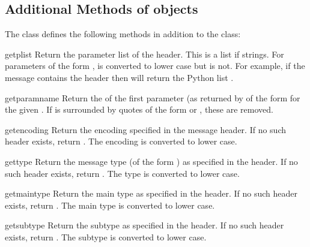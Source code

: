 \subsection{Additional Methods of  objects}

The  class defines the following methods in
addition to the  class:

\renewcommand{\indexsubitem}{(mimetool.Message method)}

\begin{funcdesc}{getplist}{}
Return the parameter list of the  header.  This is
a list if strings.  For parameters of the form
,  is converted to lower case but
 is not.  For example, if the message contains the header
 then
 will return the Python list \code{['spam=1',
'spam=2', 'Spam']}.
\end{funcdesc}

\begin{funcdesc}{getparam}{name}
Return the  of the first parameter (as returned by
 of the form  for the
given .  If  is surrounded by quotes of the form
 or , these are removed.
\end{funcdesc}

\begin{funcdesc}{getencoding}{}
Return the encoding specified in the 
message header.  If no such header exists, return .  The
encoding is converted to lower case.
\end{funcdesc}

\begin{funcdesc}{gettype}{}
Return the message type (of the form )
as specified in the  header.  If no such header
exists, return .  The type is converted to lower
case.
\end{funcdesc}

\begin{funcdesc}{getmaintype}{}
Return the main type as specified in the  header.
If no such header exists, return .  The main type is
converted to lower case.
\end{funcdesc}

\begin{funcdesc}{getsubtype}{}
Return the subtype as specified in the  header.  If
no such header exists, return .  The subtype is
converted to lower case.
\end{funcdesc}
